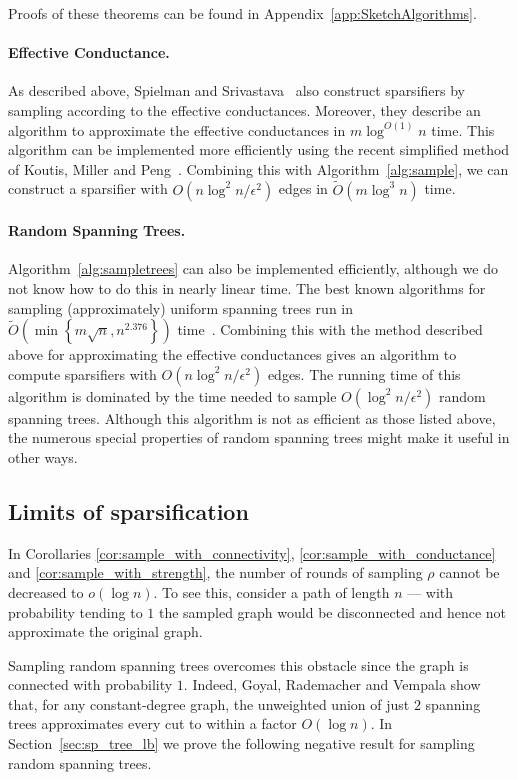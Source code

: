 \documentclass[11pt]{article}
\numberwithin{equation}{section}
\newcommand{\tO}{\tilde{O}}
\newcommand{\eps}{\epsilon}
\newcommand{\set}[1]{\left \{ #1 \right \}}                     \newcommand{\setst}[2]{\left\{\; #1 \,:\, #2 \;\right\}}
\newcommand{\Algorithm}[1]{Algorithm~\ref{alg:#1}}
\newcommand{\Appendix}[1]{Appendix~\ref{app:#1}}
\newcommand{\Section}[1]{Section~\ref{sec:#1}}
\begin{document}
Proofs of these theorems can be found in \Appendix{SketchAlgorithms}.


\paragraph{Effective Conductance.}
As described above, Spielman and Srivastava~\cite{SS} also
construct sparsifiers by sampling according to the effective conductances.
Moreover, they describe an algorithm to approximate the effective conductances
in $m \log^{O(1)} n$ time.
This algorithm can be implemented more efficiently using the recent simplified method of
Koutis, Miller and Peng~\cite{KMP}.
Combining this with \Algorithm{sample}, we can construct a sparsifier
with $O(n \log^2 n / \epsilon^2)$ edges in $\tO(m \log^3 n)$ time.


\paragraph{Random Spanning Trees.}
\Algorithm{sampletrees} can also be implemented efficiently,
although we do not know how to do this in nearly linear time.
The best known algorithms for sampling (approximately) uniform spanning trees
run in $\tO( \min \set{ m \sqrt{n}, n^{2.376} } )$ time~\cite{CMN,KM}.
Combining this with the method described above for approximating the effective conductances
gives an algorithm to compute sparsifiers with $O(n \log^2 n / \epsilon^2)$ edges.
The running time of this algorithm is dominated by the time needed to sample
$O(\log^2 n/\eps^2)$ random spanning trees.
Although this algorithm is not as efficient as those listed above,
the numerous special properties of random spanning trees 
might make it useful in other ways.




\subsection{Limits of sparsification}

In Corollaries \ref{cor:sample_with_connectivity}, \ref{cor:sample_with_conductance}
and \ref{cor:sample_with_strength},
the number of rounds of sampling $\rho$ cannot be decreased to $o(\log n)$.
To see this, consider a path of length $n$ --- with probability tending to $1$
the sampled graph would be disconnected and hence not approximate the original graph.

Sampling random spanning trees overcomes this obstacle since the graph is
connected with probability $1$.
Indeed, Goyal, Rademacher and Vempala \cite{GoyalRV09} show that, for any constant-degree graph,
the unweighted union of just $2$ spanning trees
approximates every cut to within a factor $O(\log n)$.
In \Section{sp_tree_lb} we prove the following negative result for sampling random spanning trees.
\end{document}
